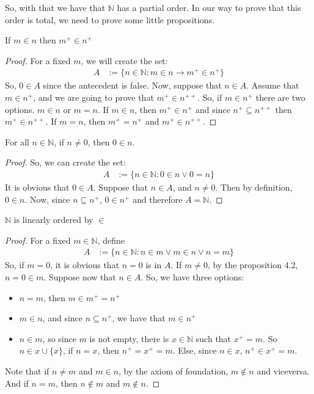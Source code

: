 \documentclass{tufte-handout}
\begin{document}
So, with that we have that $\mathbb{N}$ has a partial order. In our way to prove that this order is total, we need to prove some little propositions.

\begin{proposition}
	If $m \in n$ then $m^+ \in n^+$
\end{proposition}
\begin{proof}
	For a fixed $m$, we will create the set:
	\begin{align*}
		A&:= \{n \in \mathbb{N}: m \in n \rightarrow m^+ \in n^+\}
	\end{align*}
	So, $0 \in A$ since the antecedent is false. Now, suppose that $n \in A$. Assume that $m \in n^+$, and we are going to prove that $m^+ \in n^{++}$. So, if $m \in n^+$ there are two options. $m \in n$ or $m = n$. If $m \in n$, then $m^+ \in n^+$ and since $n^+ \subseteq n^{++}$ then $m^+ \in n^{++}$. If $m = n$, then $m^+ = n^+$ and $m^+ \in n^{++}$.
\end{proof}

\begin{proposition}
	For all $n \in \mathbb{N}$, if $n \neq 0$, then $0 \in n$.
\end{proposition}
\begin{proof}
	So, we can create the set:
	\begin{align*}
		A &:= \{n \in \mathbb{N}: 0 \in n \vee 0 = n\}
	\end{align*}
	It is obvious that $0 \in A$. Suppose that $n \in A$, and $n \neq 0$. Then by definition, $0 \in n$. Now, since $n \subseteq n^+$, $0 \in n^+$ and therefore $A = \mathbb{N}$.
\end{proof}

\begin{theorem}
	$\mathbb{N}$ is linearly ordered by $\in$
\end{theorem}
\begin{proof}
	For a fixed $m \in \mathbb{N}$, define
	\begin{align*}
		A &:= \{n \in \mathbb{N}: n \in m \vee m \in n \vee n = m\}
	\end{align*}
	So, if $m = 0$, it is obvious that $n = 0$ is in $A$. If $m \neq 0$, by the proposition 4.2, $n = 0 \in m$. Suppose now that $n \in A$. So, we have three options:
	\begin{itemize}
		\item $n = m$, then $m \in m^+ = n^+$
		\item $m \in n$, and since $n \subseteq n^+$, we have that $m \in n^+$
		\item $n \in m$, so since $m$ is not empty, there is $x \in \mathbb{N}$ such that $x^+ = m$. So $n \in x \cup \{x\}$, if $ n = x$, then $n^+ = x^+ = m$. Else, since $n \in x$, $n^+ \in x^+ = m$.
	\end{itemize}
	Note that if $n \neq m$ and $m \in n$, by the axiom of foundation, $m \not\in n$ and viceversa. And if $n = m$, then $n \not\in m$ and $m\not\in n$.
\end{proof}
\end{document}
